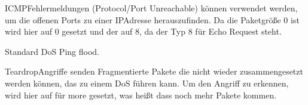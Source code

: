\documentclass[letterpaper,10pt,ngerman]{sphinxmanual}
\begin{document}
ICMP\sphinxhyphen{}Fehlermeldungen (Protocol/Port Unreachable) können verwendet werden, um die offenen Ports zu einer IP\sphinxhyphen{}Adresse herauszufinden.
Da die Paketgröße 0 ist wird hier  auf 0 gesetzt und der  auf 8, da der Typ 8 für Echo Request steht.


\begin{sphinxVerbatim}[commandchars=\\\{\}]
        \PYGZbs{}
        
\end{sphinxVerbatim}

Standard DoS Ping flood.


\begin{sphinxVerbatim}[commandchars=\\\{\}]
        \PYGZbs{}
   
\end{sphinxVerbatim}

Teardrop\sphinxhyphen{}Angriffe senden Fragmentierte Pakete die nicht wieder zusammengesetzt werden können, das zu einem DoS führen kann. Um den Angriff zu erkennen,
wird hier  auf  für more gesetzt, was heißt dass noch mehr Pakete kommen.
\end{document}
